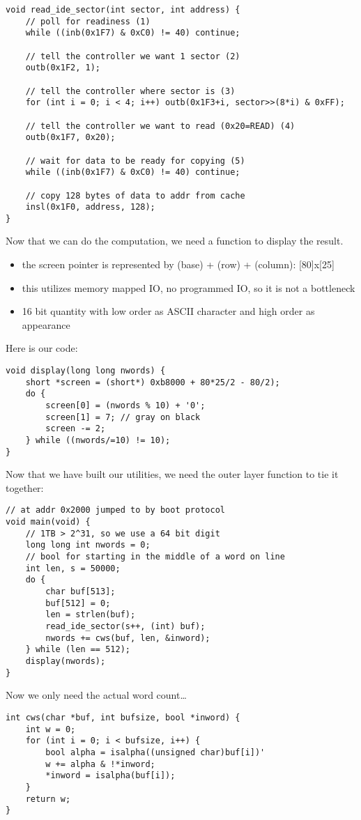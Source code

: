 \documentclass[../../lecture_notes.tex]{subfiles}
\begin{document}
\begin{lstlisting}
void read_ide_sector(int sector, int address) {
	// poll for readiness (1)
	while ((inb(0x1F7) & 0xC0) != 40) continue;
	
	// tell the controller we want 1 sector (2)
	outb(0x1F2, 1);
	
	// tell the controller where sector is (3)
	for (int i = 0; i < 4; i++) outb(0x1F3+i, sector>>(8*i) & 0xFF);
	
	// tell the controller we want to read (0x20=READ) (4)
	outb(0x1F7, 0x20);
	
	// wait for data to be ready for copying (5)
	while ((inb(0x1F7) & 0xC0) != 40) continue;
	
	// copy 128 bytes of data to addr from cache
	insl(0x1F0, address, 128);
}
\end{lstlisting}


Now that we can do the computation, we need a function to display the result. 
\begin{itemize}
\item the screen pointer is represented by (base) + (row) + (column): [80]x[25]
\item this utilizes memory mapped IO, no programmed IO, so it is not a bottleneck
\item 16 bit quantity with low order as ASCII character and high order as appearance
\end{itemize}

Here is our code:
\begin{lstlisting}
void display(long long nwords) {
	short *screen = (short*) 0xb8000 + 80*25/2 - 80/2);
	do {
		screen[0] = (nwords % 10) + '0';
		screen[1] = 7; // gray on black
		screen -= 2;
	} while ((nwords/=10) != 10);
}
\end{lstlisting}


Now that we have built our utilities, we need the outer layer function to tie it together:
\begin{lstlisting}
// at addr 0x2000 jumped to by boot protocol
void main(void) {
	// 1TB > 2^31, so we use a 64 bit digit
	long long int nwords = 0;
	// bool for starting in the middle of a word on line
	int len, s = 50000;
	do {
		char buf[513];
		buf[512] = 0;
		len = strlen(buf);
		read_ide_sector(s++, (int) buf);
		nwords += cws(buf, len, &inword);
	} while (len == 512);
	display(nwords);
}
\end{lstlisting}

Now we only need the actual word count…
\begin{lstlisting}
int cws(char *buf, int bufsize, bool *inword) {
	int w = 0;
	for (int i = 0; i < bufsize, i++) {
		bool alpha = isalpha((unsigned char)buf[i])'
		w += alpha & !*inword;
		*inword = isalpha(buf[i]);
	}
	return w;
}
\end{lstlisting}
\end{document}
